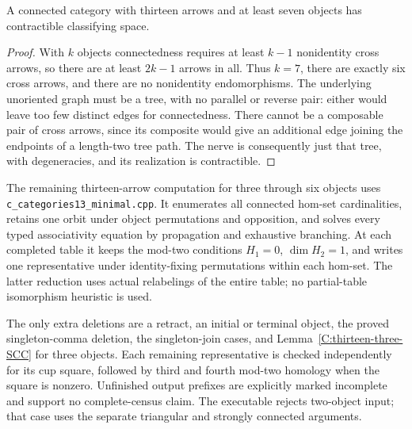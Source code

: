 \begin{lemma}\label{C:thirteen-many-objects}
A connected category with thirteen arrows and at least seven
objects has contractible classifying space.
\end{lemma}
\begin{proof}
With $k$ objects connectedness requires at least $k-1$ nonidentity
cross arrows, so there are at least $2k-1$ arrows in all. Thus
$k=7$, there are exactly six cross arrows, and there are no
nonidentity endomorphisms. The underlying unoriented graph must
be a tree, with no parallel or reverse pair: either would leave
too few distinct edges for connectedness. There cannot be a
composable pair of cross arrows, since its composite would give
an additional edge joining the endpoints of a length-two tree
path. The nerve is consequently just that tree, with degeneracies,
and its realization is contractible.
\end{proof}

\begin{remark}\label{C:thirteen-search-scope}
The remaining thirteen-arrow computation for three through six
objects uses \texttt{c\_categories13\_minimal.cpp}. It enumerates
all connected hom-set cardinalities, retains one orbit under
object permutations and opposition, and solves every typed
associativity equation by propagation and exhaustive branching.
At each completed table it keeps the mod-two conditions
$H_1=0$, $\dim H_2=1$, and writes one representative under
identity-fixing permutations within each hom-set.
The latter reduction uses actual relabelings of the entire table;
no partial-table isomorphism heuristic is used.

The only extra deletions are a retract, an initial or terminal
object, the proved singleton-comma deletion, the singleton-join
cases, and Lemma~\ref{C:thirteen-three-SCC} for three objects.
Each remaining representative is checked independently for its
cup square, followed by third and fourth mod-two homology when
the square is nonzero. Unfinished output prefixes are explicitly
marked incomplete and support no complete-census claim. The
executable rejects two-object input; that case uses the separate
triangular and strongly connected arguments.
\end{remark}

